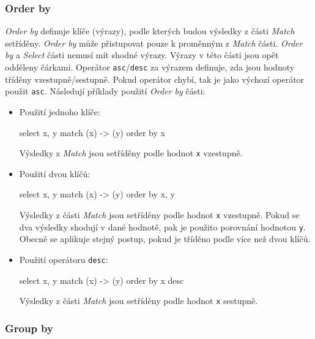 \subsubsection{Order by}

\textit{Order by} definuje klíče (výrazy), podle kterých budou výsledky z části \textit{Match} setříděny.
\textit{Order by} může přistupovat pouze k proměnným z \textit{Match} části.
\textit{Order by} a \textit{Select} části nemusí mít shodné výrazy.
Výrazy v této části jsou opět odděleny čárkami.
Operátor \texttt{asc}/\texttt{desc} za výrazem definuje, zda jsou hodnoty tříděny vzestupně/sestupně.
Pokud operátor chybí, tak je jako výchozí operátor použit \texttt{asc}.
Následují příklady použití \textit{Order by} části:
\begin{itemize}
\item
Použití jednoho klíče:
\begin{code}
select x, y match (x) -> (y) order by x
\end{code}
Výsledky z \textit{Match} jsou setříděny podle hodnot \texttt{x} vzestupně.

\item
Použití dvou klíčů:
\begin{code}
select x, y match (x) -> (y) order by x, y
\end{code}
Výsledky z části \textit{Match} jsou setříděny podle hodnot \texttt{x} vzestupně.
Pokud se dva výsledky shodují v dané hodnotě, pak je použito porovnání hodnotou \texttt{y}.
Obecně se aplikuje stejný postup, pokud je tříděno podle více než dvou klíčů.

\item
Použití operátoru \texttt{desc}:
\begin{code}
select x, y match (x) -> (y) order by x desc
\end{code}
Výsledky z části \textit{Match} jsou setříděny podle hodnot \texttt{x} sestupně.
\end{itemize}

\subsubsection{Group by}

